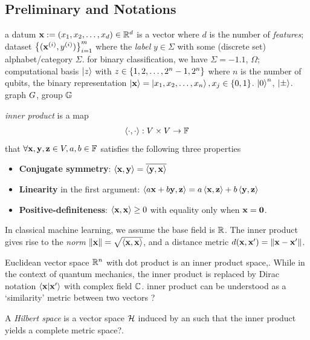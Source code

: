 \subsection{Preliminary and Notations}
a datum $\vb{x}:= (x_1,x_2,\dots,x_d) \in \mathbb{R}^d$ is a vector where $d$ is the number of \emph{features};
dataset $\qty{(\vb{x}^{(i)}, y^{(i)})}^{m}_{i=1}$ where the \emph{label} $y\in\Sigma$ with some (discrete set) alphabet/category $\Sigma$. 
for binary classification, we have $\Sigma=\qty{-1,1}$,
$\Omega$;
computational basis $\ket{z}$ with $z\in \qty{1,2,\dots,2^n-1,2^n}$ where $n$ is the number of qubits,
the binary representation $\ket{\vb{x}}=\ket{x_1,x_2,\dots,x_n},x_j\in \qty{0,1}$.
$\ket{0}^n$, $\ket{\pm}$.
graph $G$, group $\mathbb{G}$
\begin{definition}\label{def:inner_product}
	\emph{inner product} is a map
	\begin{equation}
		\expval{\cdot,\cdot}: V \times V \to \mathbb{F}
	\end{equation}
	that $\forall \vb{x},\vb{y},\vb{z}\in V,a,b\in\mathbb{F}$
	satisfies the following three properties 
	\begin{itemize}
		\item \textbf{Conjugate symmetry}:
		$\expval{\vb{x},\vb{y}}=\overline{\expval{\vb{y},\vb{x}}}$
		\item \textbf{Linearity} in the first argument:
		$\expval{a\vb{x}+b\vb{y},\vb{z}}=a\expval{\vb{x},\vb{z}}+b\expval{\vb{y},\vb{z}}$
		\item \textbf{Positive-definiteness}:
		$\expval{\vb{x},\vb{x}}\ge 0$ with equality only when $\vb{x}=\vb{0}$.
	\end{itemize}
	In classical machine learning, we assume the base field is $\mathbb{R}$.
	The inner product gives rise to the \emph{norm} $\norm{\vb{x}}=\sqrt{\expval{\vb{x},\vb{x}}}$,
	and a distance metric $d(\vb{x},\vb{x}')=\norm{\vb{x}-\vb{x}'}$.
\end{definition}
Euclidean vector space $\mathbb{R}^n$ with dot product is an inner product space,.
While in the context of quantum mechanics,
the inner product is replaced by 
Dirac notation $\braket{\vb{x}}{\vb{x}'}$ with complex field $\mathbb{C}$.
inner product can be understood as a `similarity' metric between two vectors ?
\begin{definition}\label{def:hilbert_space}
	A \emph{Hilbert space} is a vector space $\mathcal{H}$ induced by an 
	such that the inner product yields a complete metric space?.
\end{definition}

